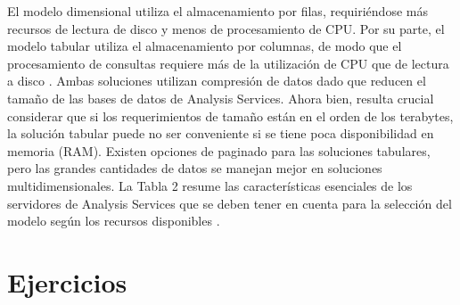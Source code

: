 \documentclass[preprint,12pt]{elsarticle}
\begin{document}
El modelo dimensional utiliza el almacenamiento por filas, requiriéndose más recursos de lectura de disco y  menos  de  procesamiento  de  CPU.  Por  su  parte,  el  modelo  tabular  utiliza  el  almacenamiento  por columnas, de modo que el procesamiento de consultas requiere  más de la  utilización  de CPU  que de lectura a disco . Ambas soluciones utilizan compresión de datos dado que reducen el tamaño de las bases de datos de Analysis Services. Ahora bien, resulta crucial considerar que si los requerimientos de tamaño están en el orden de los terabytes, la solución tabular puede no ser conveniente si se tiene poca disponibilidad en memoria (RAM). Existen opciones de paginado para las soluciones tabulares, pero las grandes cantidades de datos se manejan mejor en soluciones multidimensionales. La Tabla 2 resume las características  esenciales de  los servidores de  Analysis Services  que se  deben tener en  cuenta para  la selección del modelo según los recursos disponibles . 



\section{Ejercicios}
\end{document}
